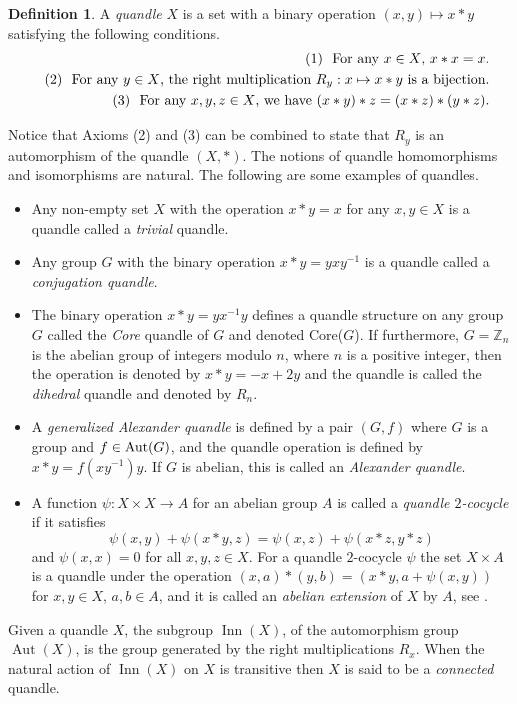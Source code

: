 \documentclass[12pt]{amsart}
\theoremstyle{definition}
\newtheorem{definition}[thm]{Definition}
\theoremstyle{remark}
\def\Aut{\operatorname{Aut}}
\def\Inn{\operatorname{Inn}}
\begin{document}
\begin{definition}
A {\it quandle} $X$ is a 
set with a binary operation $(x, y) \mapsto x * y$
satisfying the following conditions.
\begin{eqnarray*}
& &\mbox{\rm (1) \ }   \mbox{\rm  For any $x \in X$,
$x*x=x$.} \label{axiom1} \\
& & \mbox{\rm (2) \ }\mbox{\rm For any $y \in X$, the right multiplication $R_y: x \mapsto x*y$ is a bijection.} \label{axiom2} \\
& &\mbox{\rm (3) \ }  
\mbox{\rm For any $x,y,z \in X$, we have
$ (x*y)*z=(x*z)*(y*z). $} \label{axiom3} 
\end{eqnarray*}
\end{definition}
Notice that Axioms (2) and (3) can be combined to state that $R_y$ is an automorphism of the quandle $(X,*)$. The notions of quandle homomorphisms and isomorphisms are natural.  The following are some examples of quandles.
  \begin{itemize}
\item
Any non-empty set $X$ with the operation $x*y=x$ for any $x,y \in X$ is
a quandle called a  {\it trivial} quandle.

\item
Any group $G$ with the binary operation $x*y=yxy^{-1}$ is a quandle called a {\it conjugation quandle}. 


\item
The binary operation $x*y=yx^{-1}y$ defines a quandle structure on any group $G$ called the \emph{Core} quandle of $G$ and denoted Core($G$).  If furthermore, $G=\mathbb{Z}_n$ is the abelian group of integers modulo $n$, where $n$ is a positive integer, then the operation is denoted by $x * y=-x+2y$  and the quandle is called the \emph{dihedral} quandle and denoted by $R_n$.


\item

A {\it generalized Alexander quandle} is defined  by a pair $(G, f)$ where 
$G$ is a  group and $f \in {\rm Aut}(G)$,
and the quandle operation is defined by 
$x*y=f(xy^{-1}) y $. 
If $G$ is abelian, this is called an {\it Alexander quandle}. 

\item
A function $\psi: X \times X \rightarrow A$ for an abelian group $A$ is 
called a {\it quandle $2$-cocycle}  \cite{CJKLS} if it satisfies 
$$ \psi (x, y)+ \psi(x*y, z) =\psi(x,z) +  \psi(x*z, y*z)$$
and $\psi(x,x)=0$ for all $x,y,z \in X$.
For a quandle $2$-cocycle $\psi$ the set $X \times A$ is a quandle under the operation 
 $(x, a) * (y, b)=(x*y, a+\psi(x,y))$ for $x, y \in X$, $a,b \in A$,
and it is called an {\it abelian extension} of $X$ by $A$, see  \cite{CENS}.


  \end{itemize}
  Given a quandle $X$, the subgroup $\Inn(X)$, of the automorphism group $\Aut(X)$, is the group generated by the right multiplications $R_x$.  When the natural action of $\Inn(X)$ on $X$ is transitive then $X$ is said to be a \emph{connected} quandle. \\
  \par
\end{document}
